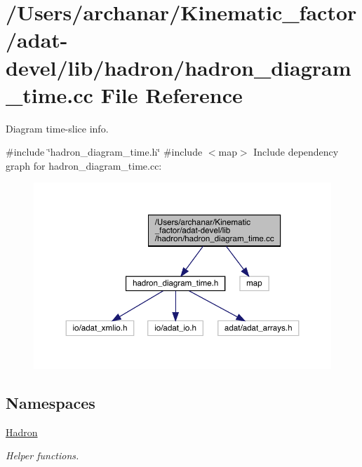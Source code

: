 \hypertarget{adat-devel_2lib_2hadron_2hadron__diagram__time_8cc}{}\section{/\+Users/archanar/\+Kinematic\+\_\+factor/adat-\/devel/lib/hadron/hadron\+\_\+diagram\+\_\+time.cc File Reference}
\label{adat-devel_2lib_2hadron_2hadron__diagram__time_8cc}


Diagram time-\/slice info.  


{\ttfamily \#include \char`\"{}hadron\+\_\+diagram\+\_\+time.\+h\char`\"{}}\newline
{\ttfamily \#include $<$map$>$}\newline
Include dependency graph for hadron\+\_\+diagram\+\_\+time.\+cc\+:
\nopagebreak
\begin{figure}[H]
\begin{center}
\leavevmode
\includegraphics[width=350pt]{d1/d66/adat-devel_2lib_2hadron_2hadron__diagram__time_8cc__incl}
\end{center}
\end{figure}
\subsection*{Namespaces}
\begin{DoxyCompactItemize}
\item 
 \mbox{\hyperlink{namespaceHadron}{Hadron}}
\begin{DoxyCompactList}\small\item\em Helper functions. \end{DoxyCompactList}\end{DoxyCompactItemize}

